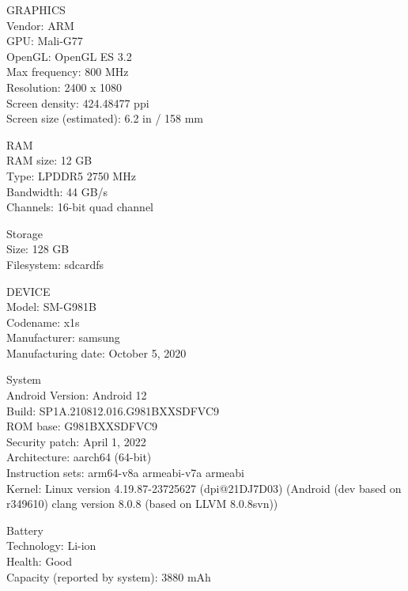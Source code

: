 \documentclass{article}
\begin{document}
\par

GRAPHICS \\
Vendor: ARM \\
GPU: Mali-G77 \\
OpenGL: OpenGL ES 3.2 \\
Max frequency: 800 MHz \\
Resolution: 2400 x 1080 \\
Screen density: 424.48477 ppi \\
Screen size (estimated): 6.2 in / 158 mm

\par

RAM \\
RAM size: 12 GB \\
Type: LPDDR5 2750 MHz \\
Bandwidth: 44 GB/s \\
Channels: 16-bit quad channel

\par

Storage \\
Size: 128 GB \\
Filesystem: sdcardfs \\

\par

DEVICE \\
Model: SM-G981B \\
Codename: x1s \\
Manufacturer: samsung \\
Manufacturing date: October 5, 2020

\par

System \\
Android Version: Android 12 \\
Build: SP1A.210812.016.G981BXXSDFVC9 \\
ROM base: G981BXXSDFVC9 \\
Security patch: April 1, 2022 \\
Architecture: aarch64 (64-bit) \\
Instruction sets: arm64-v8a armeabi-v7a armeabi \\
Kernel: Linux version 4.19.87-23725627 (dpi@21DJ7D03) (Android (dev based on r349610)
clang version 8.0.8 (based on LLVM 8.0.8svn))

\par

Battery \\
Technology: Li-ion \\
Health: Good \\
Capacity (reported by system): 3880 mAh
\end{document}

